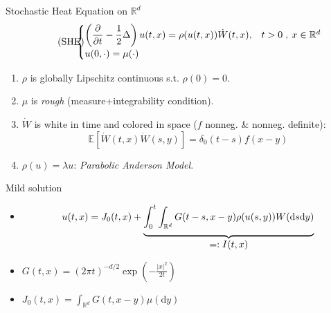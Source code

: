 \documentclass[9pt,table,xcolor=dvipsnames]{beamer}%
\newcommand{\E}{\mathbb{E}}
\newcommand{\W}{\dot{W}}
\newcommand{\ud}{\ensuremath{\mathrm{d} }}
\newcommand{\R}{\mathbb{R}}
\newcommand*\mystrut[1]{\vrule width0pt height0pt depth#1\relax}
\theoremstyle{definition}
\theoremstyle{plain}
\begin{document}
\begin{frame}[4-]{Stochastic Heat Equation on $\R^d$}
  \begin{align}\tag{SHE}
    \label{E:FracHt}
    \hspace{-1em}
     \begin{cases}
        \left(\displaystyle\frac{\partial}{\partial t} -\frac{1}{2}\Delta \right) u(t,x) = \rho(u(t,x))  \dot{W}(t,x),& t>0\;,\: x\in\R^d\\[0.5em]
        u(0,\cdot) = \mu(\cdot)
     \end{cases}
  \end{align}
  \vfill
  \begin{enumerate}
    \item $\rho$ is globally Lipschitz continuous s.t. $\rho(0)=0$.\\[1em]
    \item $\mu$ is {\it rough} (measure+integrability condition).\\[1em]
    \item $\W$ is white in time and colored in space ($f$ nonneg. \& nonneg. definite):
      \[
        \E\left[\W(t,x)\W(s,y)\right] = \delta_0(t-s)f(x-y)
      \]
    \vfill
    \item $\rho(u) = \lambda u$: {\it Parabolic Anderson Model}.
  \end{enumerate}
\end{frame}
\begin{frame}{Mild solution}
\begin{itemize}
  \item[]
  \vspace{0.5em}
    \[
      u(t,x) = J_0(t,x) +\underbrace{\mystrut{1.3em}\int_0^t\int_{\R^d} G(t-s,x-y)\rho(u(s,y))W(\ud s\ud y)}_{\displaystyle =:I(t,x)}
    \]
  \vspace{3em}
  \item[$\dagger$] $\displaystyle G(t,x)=(2\pi t)^{-d/2}\exp\left(-\frac{|x|^2}{2t}\right)$
  \vspace{1em}
  \item[$\dagger$] $\displaystyle J_0(t,x) = \int_{\R^d}G(t,x-y)\mu(\ud y)$
\end{itemize}
\end{frame}
\end{document}
